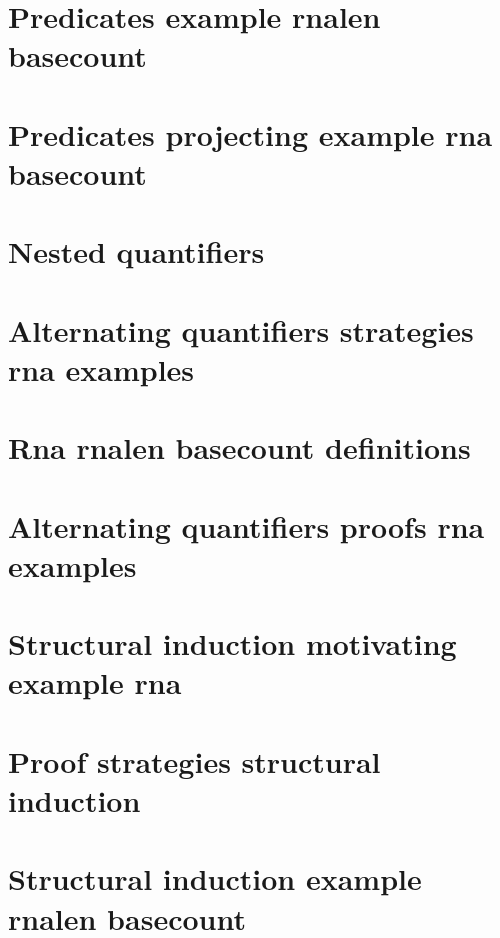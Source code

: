 \section*{Predicates example rnalen basecount}

\vfill
\section*{Predicates projecting example rna basecount}

\vfill
\section*{Nested quantifiers}

\vfill
\section*{Alternating quantifiers strategies rna examples}

\vfill
\section*{Rna rnalen basecount definitions}

\vfill
\section*{Alternating quantifiers proofs rna examples}

\vfill
\section*{Structural induction motivating example rna}

\vfill
\section*{Proof strategies structural induction}

\vfill
\section*{Structural induction example rnalen basecount}

\vfill
